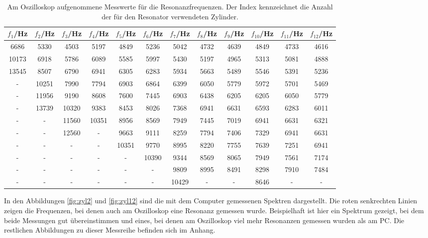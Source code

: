 \begin{table}[htp]
	\begin{center}
    \caption{Am Oszilloskop aufgenommene Messwerte für die Resonanzfrequenzen. Der
    Index kennzeichnet die Anzahl der für den Resonator verwendeten Zylinder.}
    \label{tab:oszi}
    \tiny
		\begin{tabular}{cccccccccccc}
		\toprule
			{$f_1$/Hz} & {$f_2$/Hz} & {$f_3$/Hz} & {$f_4$/Hz} & {$f_5$/Hz} & {$f_6$/Hz} & {$f_7$/Hz} & {$f_8$/Hz} & {$f_9$/Hz} & {$f_{10}$/Hz} & {$f_{11}$/Hz} & {$f_{12}$/Hz}\\
			\midrule
			6686 & 5330 & 4503 & 5197 & 4849 & 5236 & 5042 & 4732 & 4639 & 4849 & 4733 & 4616\\
			10173 & 6918 & 5786 & 6089 & 5585 & 5997 & 5430 & 5197 & 4965 & 5313 & 5081 & 4888\\
			13545 & 8507 & 6790 & 6941 & 6305 & 6283 & 5934 & 5663 & 5489 & 5546 & 5391 & 5236\\
			{-} & 10251 & 7990 & 7794 & 6903 & 6864 & 6399 & 6050 & 5779 & 5972 & 5701 & 5469\\
			{-} & 11956 & 9190 & 8608 & 7600 & 7445 & 6903 & 6438 & 6205 & 6205 & 6050 & 5779\\
			{-} & 13739 & 10320 & 9383 & 8453 & 8026 & 7368 & 6941 & 6631 & 6593 & 6283 & 6011\\
			{-} & {-} & 11560 & 10351 & 8956 & 8569 & 7949 & 7445 & 7019 & 6941 & 6631 & 6321\\
			{-} & {-} & 12560 & {-} & 9663 & 9111 & 8259 & 7794 & 7406 & 7329 & 6941 & 6631\\
			{-} & {-} & {-} & {-} & 10351 & 9770 & 8995 & 8220 & 7755 & 7639 & 7251 & 6941\\
			{-} & {-} & {-} & {-} & {-} & 10390 & 9344 & 8569 & 8065 & 7949 & 7561 & 7174\\
			{-} & {-} & {-} & {-} & {-} & {-} & 9809 & 8995 & 8491 & 8298 & 7910 & 7484\\
			{-} & {-} & {-} & {-} & {-} & {-} & 10429 & {-} & {-} & 8646 & {-} & {-}\\
		\bottomrule
		\end{tabular}
	\end{center}
\end{table}

In den Abbildungen \ref{fig:zyl2} und \ref{fig:zyl12} sind die mit dem Computer gemessenen
Spektren dargestellt. Die roten senkrechten Linien zeigen die Frequenzen, bei denen
auch am Oszilloskop eine Resonanz gemessen wurde. Beispielhaft ist hier ein Spektrum
gezeigt, bei dem beide Messungen gut übereinstimmen und eines, bei denen am Oszilloskop
viel mehr Resonanzen gemessen wurden als am PC. Die restlichen Abbildungen zu dieser
Messreihe befinden sich im Anhang.

